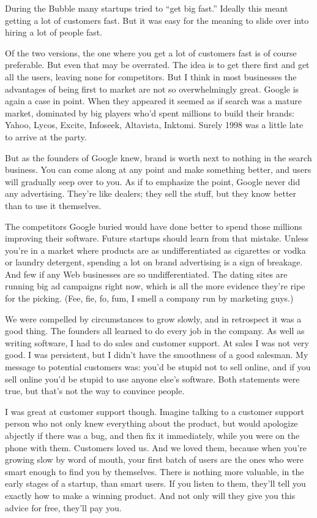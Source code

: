 \documentclass[12pt]{book}
\begin{document}
During the Bubble many startups tried to ``get big fast.'' Ideally this
meant getting a lot of customers fast. But it was easy for the meaning
to slide over into hiring a lot of people fast.

Of the two versions, the one where you get a lot of customers fast is of
course preferable. But even that may be overrated. The idea is to get
there first and get all the users, leaving none for competitors. But I
think in most businesses the advantages of being first to market are not
so overwhelmingly great. Google is again a case in point. When they
appeared it seemed as if search was a mature market, dominated by big
players who'd spent millions to build their brands: Yahoo, Lycos,
Excite, Infoseek, Altavista, Inktomi. Surely 1998 was a little late to
arrive at the party.

But as the founders of Google knew, brand is worth next to nothing in
the search business. You can come along at any point and make something
better, and users will gradually seep over to you. As if to emphasize
the point, Google never did any advertising. They're like dealers; they
sell the stuff, but they know better than to use it themselves.

The competitors Google buried would have done better to spend those
millions improving their software. Future startups should learn from
that mistake. Unless you're in a market where products are as
undifferentiated as cigarettes or vodka or laundry detergent, spending a
lot on brand advertising is a sign of breakage. And few if any Web
businesses are so undifferentiated. The dating sites are running big ad
campaigns right now, which is all the more evidence they're ripe for the
picking. (Fee, fie, fo, fum, I smell a company run by marketing guys.)

We were compelled by circumstances to grow slowly, and in retrospect it
was a good thing. The founders all learned to do every job in the
company. As well as writing software, I had to do sales and customer
support. At sales I was not very good. I was persistent, but I didn't
have the smoothness of a good salesman. My message to potential
customers was: you'd be stupid not to sell online, and if you sell
online you'd be stupid to use anyone else's software. Both statements
were true, but that's not the way to convince people.

I was great at customer support though. Imagine talking to a customer
support person who not only knew everything about the product, but would
apologize abjectly if there was a bug, and then fix it immediately,
while you were on the phone with them. Customers loved us. And we loved
them, because when you're growing slow by word of mouth, your first
batch of users are the ones who were smart enough to find you by
themselves. There is nothing more valuable, in the early stages of a
startup, than smart users. If you listen to them, they'll tell you
exactly how to make a winning product. And not only will they give you
this advice for free, they'll pay you.
\end{document}
